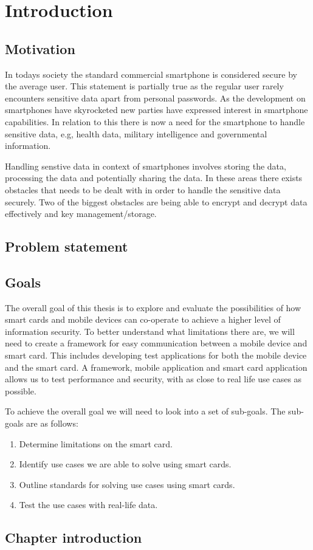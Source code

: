 \chapter{Introduction}
\section{Motivation}
In todays society the standard commercial smartphone is considered secure by the average user. This statement is partially true as the regular user rarely encounters sensitive data apart from personal passwords. As the development on smartphones have skyrocketed new parties have expressed interest in smartphone capabilities. In relation to this there is now a need for the smartphone to handle sensitive data, e.g, health data, military intelligence and governmental information.

Handling senstive data in context of smartphones involves storing the data, processing the data and potentially sharing the data. In these areas there exists obstacles that needs to be dealt with in order to handle the sensitive data securely. Two of the biggest obstacles are being able to encrypt and decrypt data effectively and key management/storage.

\section{Problem statement}


\section{Goals}
The overall goal of this thesis is to explore and evaluate the possibilities of how smart cards and mobile devices can co-operate to achieve a higher level of information security. To better understand what limitations there are, we will need to create a framework for easy communication between a mobile device and smart card. This includes developing test applications for both the mobile device and the smart card. A framework, mobile application and smart card application allows us to test performance and security, with as close to real life use cases as possible.

To achieve the overall goal we will need to look into a set of sub-goals. The sub-goals are as follows:
\begin{enumerate}
    \item Determine limitations on the smart card.
    \item Identify use cases we are able to solve using smart cards.
    \item Outline standards for solving use cases using smart cards.
    \item Test the use cases with real-life data.
\end{enumerate}

\section{Chapter introduction}
